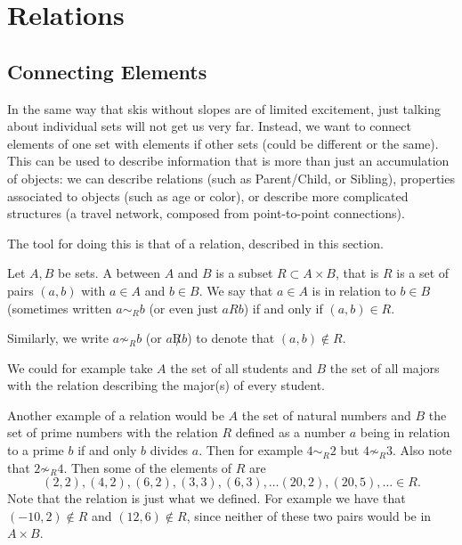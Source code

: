 \chapter{Relations}
\label{chrels}

\section{Connecting Elements}

In the same way that skis without slopes are of limited excitement, just
talking about individual sets will not get us very far. Instead, we want to
connect elements of one set with elements if other sets (could be different
or the same). This can be used to describe information that is more than
just an accumulation of objects: we can describe relations (such as
Parent/Child, or Sibling), properties associated to objects (such as age
or color), or describe more complicated structures (a travel network,
composed from point-to-point connections).

The tool for doing this is that of a relation, described in this section.

\begin{defn}
Let $A,B$ be sets. A  between $A$ and $B$ is a subset
$R\subset A\times B$, that is $R$ is a set of pairs $(a,b)$ with $a\in A$
and $b\in B$. We say that $a\in A$ is in relation to $b\in B$ (sometimes
written $a\sim_R b$ (or even just $aRb$) if and only if $(a,b)\in R$.
\end{defn}
Similarly, we write $a\not\sim_R b$ (or $a\not R b$) to denote that
$(a,b)\not\in R$.

We could for example take $A$ the set of all students and $B$ the set of all
majors with the relation describing the major(s) of every
student.

Another example of a relation would be $A$ the set of natural numbers and
$B$ the set of prime numbers with the relation $R$ defined as a number $a$
being in relation to a prime $b$ if and only $b$ divides $a$. Then for
example $4\sim_R 2$ but $4\not\sim_R 3$. Also note that $2\not\sim_R 4$. Then some of the
elements of $R$ are
\[
(2,2), (4,2), (6,2), (3,3), (6,3), \ldots (20,2),(20,5),\ldots \in R.
\]
Note that the relation is just what we defined. For example we have that
$(-10,2)\not\in R$ and $(12,6)\not\in R$, since neither of these two pairs
would be in $A\times B$.
\smallskip


